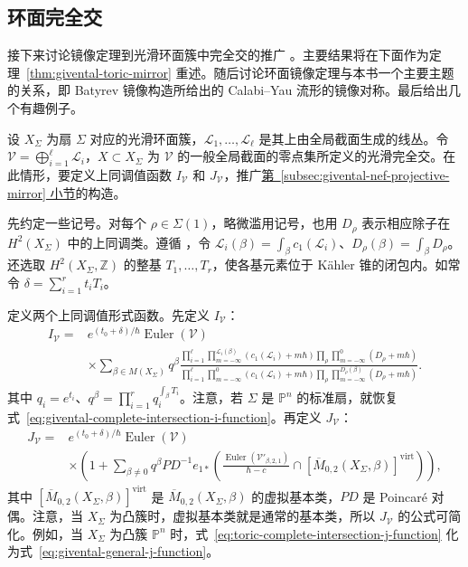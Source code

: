 \subsection{环面完全交}\label{subsec:givental-toric-mirror}
接下来讨论镜像定理到光滑环面簇中完全交的推广 。主要结果将在下面作为定理~\ref{thm:givental-toric-mirror} 重述。随后讨论环面镜像定理与本书一个主要主题的关系，即 Batyrev 镜像构造所给出的 Calabi--Yau 流形的镜像对称。最后给出几个有趣例子。

设 $X_\Sigma$ 为扇 $\Sigma$ 对应的光滑环面簇，$\mathcal L_1,\ldots,\mathcal L_\ell$ 是其上由全局截面生成的线丛。令 $\mathcal V=\bigoplus_{i=1}^{\ell}\mathcal L_i$，$X\subset X_\Sigma$ 为 $\mathcal V$ 的一般全局截面的零点集所定义的光滑完全交。在此情形，要定义上同调值函数 $I_{\mathcal V}$ 和 $J_{\mathcal V}$，推广\hyperref[subsec:givental-nef-projective-mirror]{第~\ref*{subsec:givental-nef-projective-mirror} 小节}的构造。

先约定一些记号。对每个 $\rho\in\Sigma(1)$，略微滥用记号，也用 $D_\rho$ 表示相应除子在 $H^2(X_\Sigma)$ 中的上同调类。遵循 ，令 $\mathcal L_i(\beta)=\int_\beta c_1(\mathcal L_i)$、$D_\rho(\beta)=\int_\beta D_\rho$。还选取 $H^2(X_\Sigma,\mathbb Z)$ 的整基 $T_1,\ldots,T_r$，使各基元素位于 Kähler 锥的闭包内。如常令 $\delta=\sum_{i=1}^r t_iT_i$。

定义两个上同调值形式函数。先定义 $I_{\mathcal V}$：
\begin{equation}\label{eq:toric-complete-intersection-i-function}
\begin{aligned}
I_{\mathcal V}={}&e^{(t_0+\delta)/\hbar}\operatorname{Euler}(\mathcal V)\\
&\times\sum_{\beta\in M(X_\Sigma)}q^\beta
\frac{\prod_{i=1}^{\ell}\prod_{m=-\infty}^{\mathcal L_i(\beta)}(c_1(\mathcal L_i)+m\hbar)\prod_\rho\prod_{m=-\infty}^0(D_\rho+m\hbar)}{\prod_{i=1}^{\ell}\prod_{m=-\infty}^0(c_1(\mathcal L_i)+m\hbar)\prod_\rho\prod_{m=-\infty}^{D_\rho(\beta)}(D_\rho+m\hbar)}.
\end{aligned}
\end{equation}
其中 $q_i=e^{t_i}$、$q^\beta=\prod_{i=1}^r q_i^{\int_\beta T_i}$。注意，若 $\Sigma$ 是 $\mathbb P^n$ 的标准扇，就恢复式~\eqref{eq:givental-complete-intersection-i-function}。再定义 $J_{\mathcal V}$：
\begin{equation}\label{eq:toric-complete-intersection-j-function}
\begin{aligned}
J_{\mathcal V}={}&e^{(t_0+\delta)/\hbar}\operatorname{Euler}(\mathcal V)\\
&\times\left(1+\sum_{\beta\ne0}q^\beta PD^{-1}e_{1*}
\left(\frac{\operatorname{Euler}(\mathcal V'_{\beta,2,1})}{\hbar-c}\cap[\overline M_{0,2}(X_\Sigma,\beta)]^{\mathrm{virt}}\right)\right),
\end{aligned}
\end{equation}
其中 $[\overline M_{0,2}(X_\Sigma,\beta)]^{\mathrm{virt}}$ 是 $\overline M_{0,2}(X_\Sigma,\beta)$ 的虚拟基本类，$PD$ 是 Poincaré 对偶。注意，当 $X_\Sigma$ 为凸簇时，虚拟基本类就是通常的基本类，所以 $J_{\mathcal V}$ 的公式可简化。例如，当 $X_\Sigma$ 为凸簇 $\mathbb P^n$ 时，式~\eqref{eq:toric-complete-intersection-j-function} 化为式~\eqref{eq:givental-general-j-function}。

